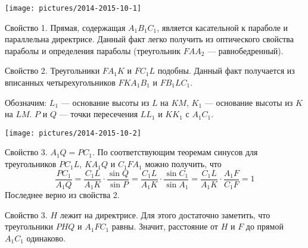 \documentclass[12pt, a4paper]{article}
\begin{document}
\begin{enumerate}
\begin{center}
\texttt{[image: pictures/2014-2015-10-1]}
\end{center}

Свойство 1. Прямая, содержащая $A_1B_1C_1$, является касательной к параболе и параллельна директрисе. Данный факт легко получить из оптического свойства параболы и определения параболы (треугольник $FAA_2$ --- равнобедренный).

Свойство 2. Треугольники $FA_1K$ и $FC_1L$ подобны. Данный факт получается из вписанных четырехугольников $FKA_1B_1$ и $FB_1LC_1$.

Обозначим: $L_1$ --- основание высоты из $L$ на $KM$, $K_1$ --- основание высоты из $K$ на $LM$. $P$ и $Q$ --- точки пересечения $LL_1$ и $KK_1$ с $A_1C_1$.

\begin{center}
\texttt{[image: pictures/2014-2015-10-2]}
\end{center}

Свойство 3. $A_1Q = PC_1$. По соответствующим теоремам синусов для треугольников $PC_1L$, $KA_1Q$ и $C_1FA_1$ можно получить, что 
$$ \frac{PC_1}{A_1Q} = \frac{C_1L}{A_1K} \cdot \frac{\sin Q}{\sin P} = \frac{C_1L}{A_1K} \cdot \frac{\sin C_1}{\sin A_1} = \frac{C_1L}{A_1K} \cdot \frac{A_1F}{C_1F} = 1$$
Последнее верно из свойства 2.

Свойство 3. $H$ лежит на директрисе. Для этого достаточно заметить, что треугольники $PHQ$ и $A_1FC_1$ равны. Значит, расстояние от $H$ и $F$ до прямой $A_1C_1$ одинаково.


\end{enumerate}
\end{document}
